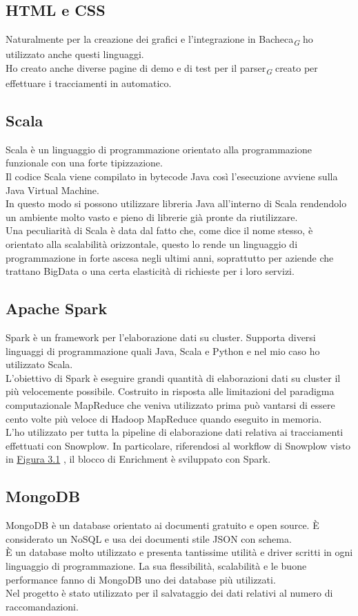 \documentclass[a4paper, 12pt, twoside, openright]{book}
\newcommand{\gloss}[1]{#1\textsubscript{\textit{\tiny{G}}}}
\begin{document}
\subsection{HTML e CSS}
Naturalmente per la creazione dei grafici e l'integrazione in \gloss{Bacheca} ho utilizzato anche questi linguaggi.\\Ho creato anche diverse pagine di demo e di test per il \gloss{parser} creato per effettuare i tracciamenti in automatico.\\
\subsection{Scala}
Scala è un linguaggio di programmazione orientato alla programmazione funzionale con una forte tipizzazione.\\
Il codice Scala viene compilato in bytecode Java così l'esecuzione avviene sulla Java Virtual Machine.\\
In questo modo si possono utilizzare libreria Java all'interno di Scala rendendolo un ambiente molto vasto e pieno di librerie già pronte da riutilizzare.\\
Una peculiarità di Scala è data dal fatto che, come dice il nome stesso, è orientato alla scalabilità orizzontale, questo lo rende un linguaggio di programmazione in forte ascesa negli ultimi anni, soprattutto per aziende che trattano BigData o una certa elasticità di richieste per i loro servizi.\\
\subsection{Apache Spark}
Spark è un framework per l'elaborazione dati su cluster. Supporta diversi linguaggi di programmazione quali Java, Scala e Python e nel mio caso ho utilizzato Scala.\\
L'obiettivo di Spark è eseguire grandi quantità di elaborazioni dati su cluster il più velocemente possibile. Costruito in risposta alle limitazioni del paradigma computazionale MapReduce che veniva utilizzato prima può vantarsi di essere cento volte più veloce di Hadoop MapReduce quando eseguito in memoria.\\
L'ho utilizzato per tutta la pipeline di elaborazione dati relativa ai tracciamenti effettuati con Snowplow. In particolare, riferendosi al workflow di Snowplow visto in \hyperref[snowplow-workflow]{Figura 3.1}
, il blocco di Enrichment è sviluppato con Spark.\\
\subsection{MongoDB}
MongoDB è un database orientato ai documenti gratuito e open source. \`{E} considerato un NoSQL e usa dei documenti stile JSON con schema.\\
\`{E} un database molto utilizzato e presenta tantissime utilità e driver scritti in ogni linguaggio di programmazione. La sua flessibilità, scalabilità e le buone performance fanno di MongoDB uno dei database più utilizzati.\\
Nel progetto è stato utilizzato per il salvataggio dei dati relativi al numero di raccomandazioni.\\
\end{document}
